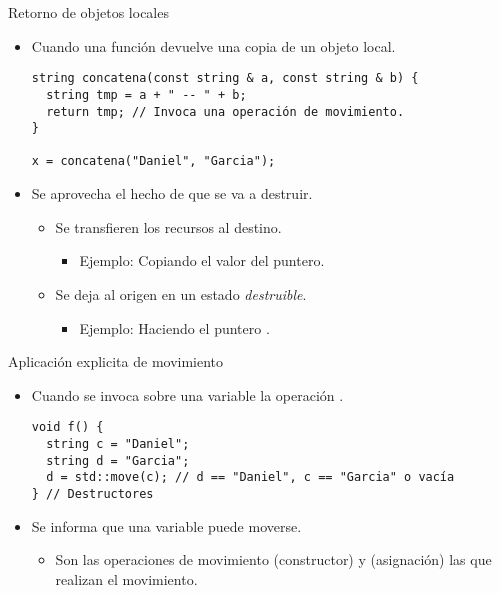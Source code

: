 \begin{frame}[fragile]{Retorno de objetos locales}
\begin{itemize}
  \item Cuando una función devuelve una copia de un objeto local.
\begin{lstlisting}
string concatena(const string & a, const string & b) {
  string tmp = a + " -- " + b;
  return tmp; // Invoca una operación de movimiento.
}

x = concatena("Daniel", "Garcia");
\end{lstlisting}
  \item Se aprovecha el hecho de que  se va a destruir.
    \begin{itemize}
      \item Se transfieren los recursos al destino.
        \begin{itemize}
          \item Ejemplo: Copiando el valor del puntero.
        \end{itemize}
      \item Se deja al origen en un estado \emph{destruible}.
        \begin{itemize}
          \item Ejemplo: Haciendo el puntero .
        \end{itemize}
    \end{itemize}
\end{itemize}
\end{frame}

\begin{frame}[fragile]{Aplicación explicita de movimiento}
\begin{itemize}
  \item Cuando se invoca sobre una variable la operación .
\begin{lstlisting}
void f() {
  string c = "Daniel";
  string d = "Garcia";
  d = std::move(c); // d == "Daniel", c == "Garcia" o vacía
} // Destructores
\end{lstlisting}
  \item Se informa que una variable puede moverse.
    \begin{itemize}
      \item Son las operaciones de movimiento (constructor) y (asignación) las
            que realizan el movimiento.
    \end{itemize}
\end{itemize}
\end{frame}

